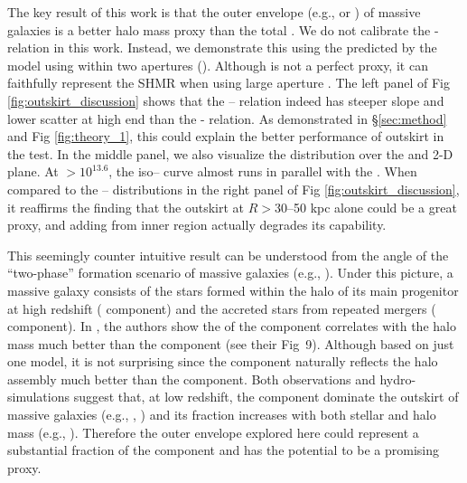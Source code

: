 \documentclass[fleqn,usenatbib,useAMS,english]{mnras}
\begin{document}
    The key result of this work is that the outer envelope \mstar{} 
    (e.g.,  or ) of massive galaxies is a better halo mass proxy 
    than the total \mstar{}.
    We do not calibrate the \mvir{}- relation in this work.
    Instead, we demonstrate this using the \mvir{} predicted by the \asap{} model using \mstar{} 
    within two apertures (\citealt{Huang2020}).
    Although \masap{} is not a perfect \mvir{} proxy, it can faithfully represent the SHMR 
    when using large aperture \mstar{}.
    The left panel of Fig \ref{fig:outskirt_discussion} shows that the \masap{}--
    relation indeed has steeper slope and lower scatter at high \masap{} end than the 
    \masap{}-\mmax{} relation.
    As demonstrated in \S \ref{sec:method} and Fig \ref{fig:theory_1}, this could explain the 
    better performance of outskirt \mstar{} in the \topn{} test.
    In the middle panel, we also visualize the \masap{} distribution over the 
    and  2-D plane.
    At \masap{}$>10^{13.6}$, the iso--\masap{} curve almost runs in parallel with the 
    .
    When compared to the -- distributions in the right panel of 
    Fig \ref{fig:outskirt_discussion}, it reaffirms the finding that the outskirt
    \mstar{} at $R > 30$--50 kpc alone could be a great \mvir{} proxy, and adding \mstar{} 
    from inner region actually degrades its capability.
    
    This seemingly counter intuitive result can 
    be understood from the angle of the ``two-phase'' formation scenario of massive galaxies
    (e.g., \citealt{Oser2010, vanDokkum2010, Moster2020}).
    Under this picture, a massive galaxy consists of the stars formed within the halo of its main 
    progenitor at high redshift (\insitu{} component) and the accreted stars from repeated mergers 
    (\exsitu{} component).
    In \citet{Bradshaw2020}, the authors show the \mstar{} of the \exsitu{} component
    correlates with the halo mass much better than the \insitu{} component (see their Fig~9). 
    Although based on just one model, it is not surprising since the \exsitu{} component
    naturally reflects the halo assembly much better than the \insitu{} component.
    Both observations and hydro-simulations suggest that, at low redshift, the \exsitu{} 
    component dominate the outskirt of massive galaxies (e.g., \citealt{RodriguezGomez2016},
    \addref{}) and its fraction increases with both stellar and halo mass 
    (e.g., \addref{}).
    Therefore the outer envelope \mstar{} explored here could represent a substantial fraction
    of the \exsitu{} component and has the potential to be a promising \mvir{} proxy.
    
\end{document}
